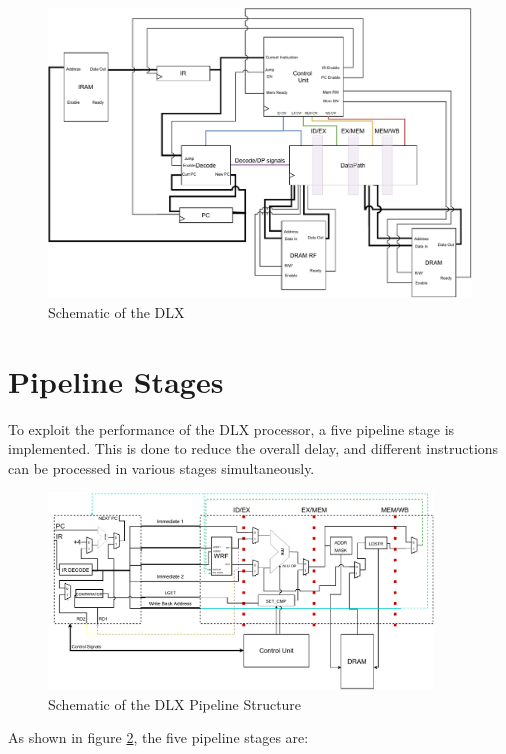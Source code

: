\begin{figure}[ht]
    \centering
    \includegraphics[width=1\textwidth]{chapters/2_dlx/images/DLX.pdf}
    \caption{Schematic of the DLX}
    \label{DLX}
\end{figure} 

\newpage
\section{Pipeline Stages}

To exploit the performance of the DLX processor, a five pipeline stage is implemented. This is done to reduce the overall delay, and different instructions can be processed in various stages simultaneously.

\begin{figure}[H]
    \centering
    \includegraphics[width=0.91\textwidth]{chapters/2_dlx/images/DLX_DP.pdf}
    \caption{Schematic of the DLX Pipeline Structure}
    \label{DLX_DP}
\end{figure} 

As shown in figure \ref{DLX_DP}, the five pipeline stages are:

